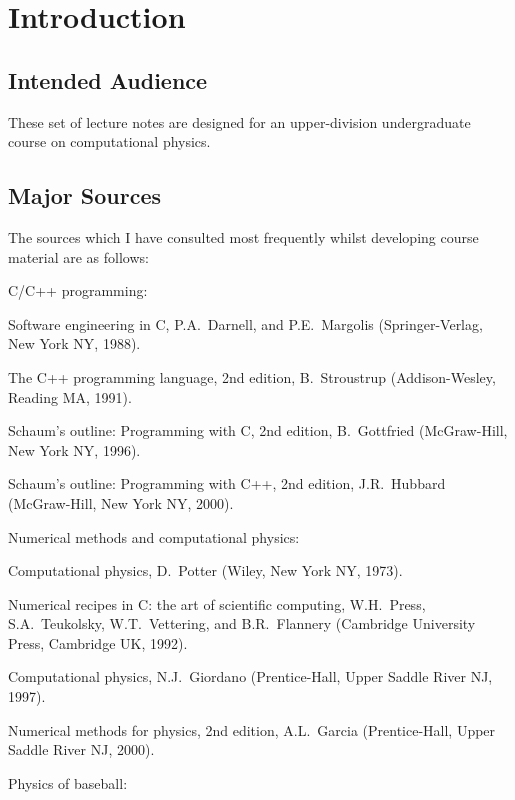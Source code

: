 \chapter{Introduction}

\section{Intended Audience}These set of lecture notes are designed for an upper-division undergraduate
course on computational physics.

\section{Major Sources}
The sources which I have consulted most frequently whilst developing course material are as
follows:
\begin{description}
\item {\sc C/C++ programming:}
\begin{description}
\item {\sf Software engineering in C}, P.A.~Darnell, and P.E.~Margolis (Springer-Verlag, New York NY, 1988).
\item {\sf The C++ programming language}, 2nd edition, B.~Stroustrup (Addison-Wesley, Reading MA, 1991).
\item {\sf Schaum's outline: Programming with C}, 2nd edition, B.~Gottfried (McGraw-Hill, New York
NY, 1996).
\item {\sf Schaum's outline: Programming with C++}, 2nd edition, J.R.~Hubbard (McGraw-Hill, New York
NY, 2000).
\end{description}
\item {\sc Numerical methods and computational physics:}
\begin{description}
\item {\sf Computational physics}, D.~Potter (Wiley, New York NY, 1973).
\item {\sf Numerical recipes in C: the
art of scientific computing}, W.H.~Press, S.A.~Teukolsky, W.T.~Vettering, and
B.R.~Flannery (Cambridge University Press, Cambridge UK, 1992).
\item {\sf Computational physics}, N.J.~Giordano (Prentice-Hall, Upper Saddle River
NJ, 1997).
\item {\sf Numerical methods for physics}, 2nd edition, A.L.~Garcia (Prentice-Hall, Upper Saddle River
NJ, 2000).
\end{description}
\item {\sc Physics of baseball:}

\end{description}
